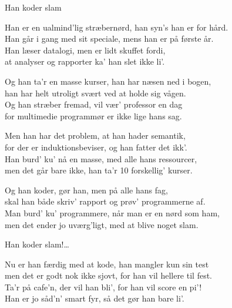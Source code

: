 \begin{song}{Han koder slam}
  \begin{SBVerse}
    Han er en ualmind'lig stræbernørd, han syn's han er for hård.\\
    Han går i gang med sit speciale, mens han er på første år.\\
    Han læser datalogi, men er lidt skuffet fordi,\\
    at analyser og rapporter ka' han slet ikke li'.
  \end{SBVerse}

  \begin{SBVerse}
    Og han ta'r en masse kurser, han har næsen ned i bogen,\\
    han har helt utroligt svært ved at holde sig vågen.\\
    Og han stræber fremad, vil vær' professor en dag\\
    for multimedie programmør er ikke lige hans sag.
  \end{SBVerse}

  \begin{SBVerse}
    Men han har det problem, at han hader semantik,\\
    for der er induktionsbeviser, og han fatter det ikk'.\\
    Han burd' ku' nå en masse, med alle hans ressourcer,\\
    men det går bare ikke, han ta'r 10 forskellig' kurser.
  \end{SBVerse}

  \begin{SBVerse}
    Og han koder, gør han, men på alle hans fag,\\
    skal han både skriv' rapport og prøv' programmerne af.\\
    Man burd' ku' programmere, når man er en nørd som ham,\\
    men det ender jo uværg'ligt, med at blive noget slam.
  \end{SBVerse}

  \begin{SBChorus}
    Han koder slam!\ldots
  \end{SBChorus}

  \begin{SBVerse}
    Nu er han færdig med at kode, han mangler kun sin test\\
    men det er godt nok ikke sjovt, for han vil hellere til fest.\\
    Ta'r på cafe'n, der vil han bli', for han vil score en pi'!\\
    Han er jo såd'n' smart fyr, så det gør han bare li'.
  \end{SBVerse}


\end{song}
